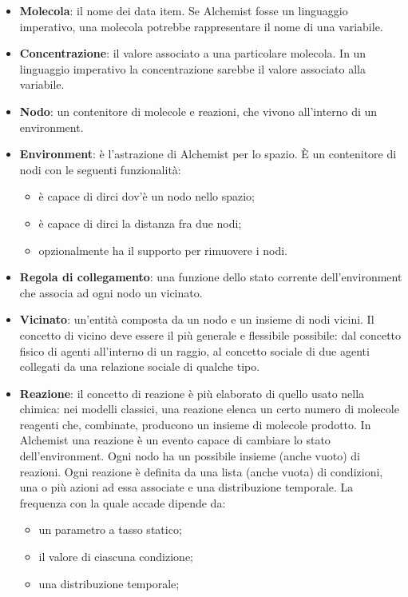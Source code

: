 \documentclass[12pt,a4paper,openright,twoside]{book}
\begin{document}
\begin{itemize}
    \item \textbf{Molecola}: il nome dei data item. Se Alchemist fosse un linguaggio imperativo, una molecola potrebbe rappresentare il nome di una variabile. 
    \item \textbf{Concentrazione}: il valore associato a una particolare molecola. In un linguaggio imperativo la concentrazione sarebbe il valore associato alla variabile. 
    \item \textbf{Nodo}: un contenitore di molecole e reazioni, che vivono all'interno di un environment. 
    \item \textbf{Environment}: è l'astrazione di Alchemist per lo spazio. È un contenitore di nodi con le seguenti funzionalità: 
    \begin{itemize}
        \item è capace di dirci dov'è un nodo nello spazio;
        \item è capace di dirci la distanza fra due nodi;
        \item opzionalmente ha il supporto per rimuovere i nodi.
    \end{itemize}
    \item \textbf{Regola di collegamento}: una funzione dello stato corrente dell'environment che associa ad ogni nodo un vicinato. 
    \item \textbf{Vicinato}: un'entità composta da un nodo e un insieme di nodi vicini. Il concetto di vicino deve essere il più generale e flessibile possibile: dal concetto fisico di agenti all'interno di un raggio, al concetto sociale di due agenti collegati da una relazione sociale di qualche tipo. 
    \item \textbf{Reazione}: il concetto di reazione è più elaborato di quello usato nella chimica: nei modelli classici, una reazione elenca un certo numero di molecole reagenti che, combinate, producono un insieme di molecole prodotto. In Alchemist una reazione è un evento capace di cambiare lo stato dell'environment. Ogni nodo ha un possibile insieme (anche vuoto) di reazioni. Ogni reazione è definita da una lista (anche vuota) di condizioni, una o più azioni ad essa associate e una distribuzione temporale. La frequenza con la quale accade dipende da:
    \begin{itemize}
        \item un parametro a tasso statico; 
        \item il valore di ciascuna condizione; 
        \item una distribuzione temporale;

\end{itemize}
\end{itemize}
\end{document}

